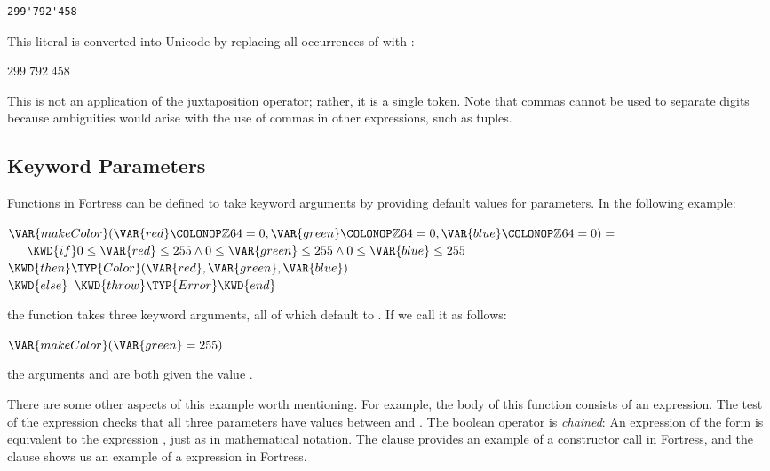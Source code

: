 \begin{verbatim}
299'792'458
\end{verbatim}

This literal is converted into Unicode by replacing all occurrences of
 with :
\begin{Fortress}
\(299{}\;792{}\;458\)
\end{Fortress}
This is not an application of the juxtaposition operator;
rather, it is a single token.
Note that commas cannot be used to separate digits because ambiguities
would arise with the use of commas in other expressions,
such as tuples.

\subsection{Keyword Parameters}

Functions in Fortress can be defined to take keyword arguments by
providing default values for parameters. In
the following example:

\begin{Fortress}
\(\VAR{makeColor}(\VAR{red}\COLONOP\mathbb{Z}64 = 0, \VAR{green}\COLONOP\mathbb{Z}64 = 0, \VAR{blue}\COLONOP\mathbb{Z}64 = 0) =\)\\
{\tt~~~}\pushtabs\=\+\(   \KWD{if} 0 \leq \VAR{red} \leq 255 \wedge 0 \leq \VAR{green} \leq 255 \wedge 0 \leq \VAR{blue} \leq 255 \)\\
\(   \KWD{then} \TYP{Color}(\VAR{red},\VAR{green},\VAR{blue})\)\\
\(   \KWD{else}\;\;\KWD{throw} \TYP{Error} \KWD{end}\)\-\\\poptabs
\end{Fortress}

the function  takes three keyword arguments, all of
which default to . If we call it as follows:

\begin{Fortress}
\(\VAR{makeColor}(\VAR{green} = 255)\)
\end{Fortress}

the arguments  and  are both given the value .

There are some other aspects of this example worth mentioning.
For example,
the body of this function consists of an  expression.
The test of the  expression checks that
all three parameters have values between  and . The
boolean operator \EXP{\leq} is \emph{chained}: An expression of
the form  is equivalent to the expression
, just as in mathematical notation.
The  clause provides an example of a constructor call in Fortress,
and the  clause shows us an example
of a  expression in Fortress.

